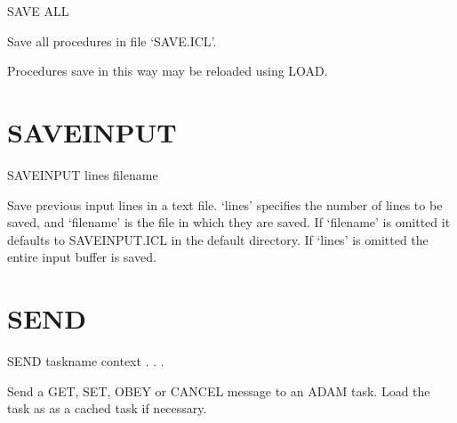    SAVE  ALL

 Save all procedures in file `SAVE.ICL'.

 Procedures save in this way may be reloaded using LOAD.

\section{SAVEINPUT}

   SAVEINPUT \hspace{.5cm} lines \hspace{.5cm} filename

 Save previous input lines in a text file. `lines' specifies the number of
lines to be saved, and `filename' is the file in which they are saved. If
`filename' is omitted it defaults to SAVEINPUT.ICL in the default directory.
If `lines' is omitted the entire input buffer is saved.

\section{SEND}

    SEND \hspace{.5cm} taskname \hspace{.5cm} context \hspace{.5cm} . . . 

 Send a GET, SET, OBEY or CANCEL message to an ADAM task. Load the
 task as as a cached task if necessary.

